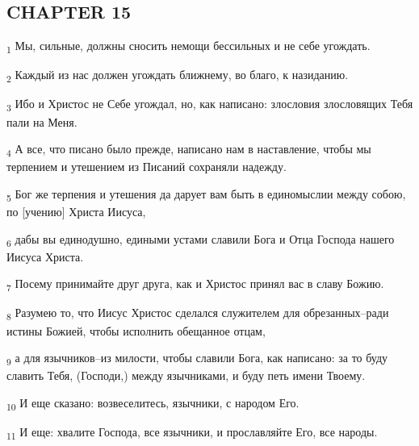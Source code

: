 \subsection{CHAPTER 15}
\begin{tcolorbox}
\textsubscript{1} Мы, сильные, должны сносить немощи бессильных и не себе угождать.
\end{tcolorbox}
\begin{tcolorbox}
\textsubscript{2} Каждый из нас должен угождать ближнему, во благо, к назиданию.
\end{tcolorbox}
\begin{tcolorbox}
\textsubscript{3} Ибо и Христос не Себе угождал, но, как написано: злословия злословящих Тебя пали на Меня.
\end{tcolorbox}
\begin{tcolorbox}
\textsubscript{4} А все, что писано было прежде, написано нам в наставление, чтобы мы терпением и утешением из Писаний сохраняли надежду.
\end{tcolorbox}
\begin{tcolorbox}
\textsubscript{5} Бог же терпения и утешения да дарует вам быть в единомыслии между собою, по [учению] Христа Иисуса,
\end{tcolorbox}
\begin{tcolorbox}
\textsubscript{6} дабы вы единодушно, едиными устами славили Бога и Отца Господа нашего Иисуса Христа.
\end{tcolorbox}
\begin{tcolorbox}
\textsubscript{7} Посему принимайте друг друга, как и Христос принял вас в славу Божию.
\end{tcolorbox}
\begin{tcolorbox}
\textsubscript{8} Разумею то, что Иисус Христос сделался служителем для обрезанных--ради истины Божией, чтобы исполнить обещанное отцам,
\end{tcolorbox}
\begin{tcolorbox}
\textsubscript{9} а для язычников--из милости, чтобы славили Бога, как написано: за то буду славить Тебя, (Господи,) между язычниками, и буду петь имени Твоему.
\end{tcolorbox}
\begin{tcolorbox}
\textsubscript{10} И еще сказано: возвеселитесь, язычники, с народом Его.
\end{tcolorbox}
\begin{tcolorbox}
\textsubscript{11} И еще: хвалите Господа, все язычники, и прославляйте Его, все народы.
\end{tcolorbox}
